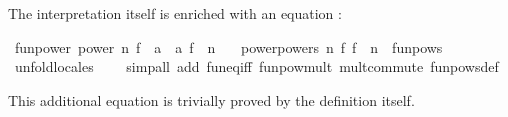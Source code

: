 \begin{isabellebody}
\begin{isamarkuptext}
  The interpretation itself is enriched with an equation :%
\end{isamarkuptext}%
\isamarkuptrue%
%
\isadelimquote
%
\endisadelimquote
%
\isatagquote
{}\isamarkupfalse%
\ fun{}power{}\ power\ {}{}n\ {}f\ {}{}\ {}a\ {}\ {}a{}{}\ f\ {}{}\ n{}\ \isanewline
\ \ {}power{}powers\ {}{}n\ f{}\ f\ {}{}\ n{}\ {}\ funpows{}\isanewline
\ \ \isamarkupfalse%
\ unfold{}locales\isanewline
\ \ \ \ {}simp{}all\ add{}\ fun{}eq{}iff\ funpow{}mult\ mult{}commute\ funpows{}def{}%
\endisatagquote
{\isafoldquote}%
%
\isadelimquote
%
\endisadelimquote
%
\begin{isamarkuptext}%
\noindent This additional equation is trivially proved by the
  definition itself.


\end{isamarkuptext}
\end{isabellebody}
